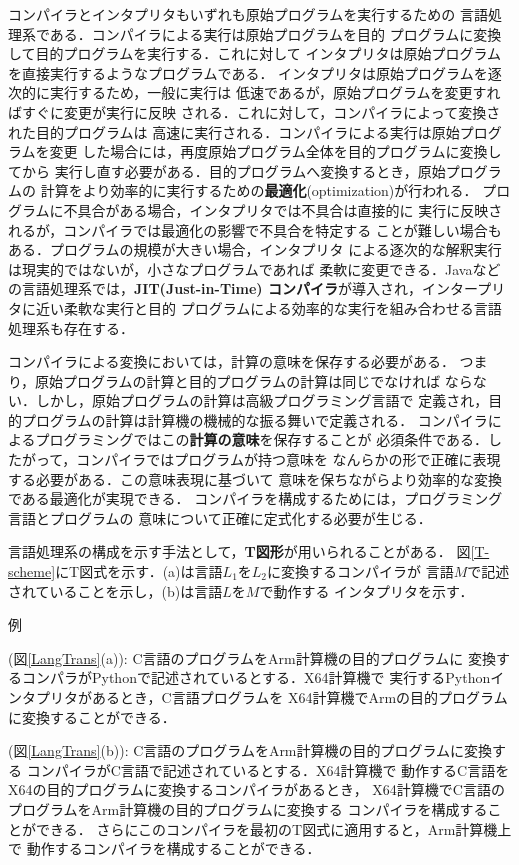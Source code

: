 \documentclass[dvipdfmx,a4j]{jbook}
\newcounter{coffee}
\begin{document}
コンパイラとインタプリタもいずれも原始プログラムを実行するための
言語処理系である．コンパイラによる実行は原始プログラムを目的
プログラムに変換して目的プログラムを実行する．これに対して
インタプリタは原始プログラムを直接実行するようなプログラムである．
インタプリタは原始プログラムを逐次的に実行するため，一般に実行は
低速であるが，原始プログラムを変更すればすぐに変更が実行に反映
される．これに対して，コンパイラによって変換された目的プログラムは
高速に実行される．コンパイラによる実行は原始プログラムを変更
した場合には，再度原始プログラム全体を目的プログラムに変換してから
実行し直す必要がある．目的プログラムへ変換するとき，原始プログラムの
計算をより効率的に実行するための{\bf 最適化}(optimization)が行われる．
プログラムに不具合がある場合，インタプリタでは不具合は直接的に
実行に反映されるが，コンパイラでは最適化の影響で不具合を特定する
ことが難しい場合もある．プログラムの規模が大きい場合，インタプリタ
による逐次的な解釈実行は現実的ではないが，小さなプログラムであれば
柔軟に変更できる．Javaなどの言語処理系では，{\bf JIT(Just-in-Time)
コンパイラ}が導入され，インタープリタに近い柔軟な実行と目的
プログラムによる効率的な実行を組み合わせる言語処理系も存在する．

コンパイラによる変換においては，計算の意味を保存する必要がある．
つまり，原始プログラムの計算と目的プログラムの計算は同じでなければ
ならない．しかし，原始プログラムの計算は高級プログラミング言語で
定義され，目的プログラムの計算は計算機の機械的な振る舞いで定義される．
コンパイラによるプログラミングではこの{\bf 計算の意味}を保存することが
必須条件である．したがって，コンパイラではプログラムが持つ意味を
なんらかの形で正確に表現する必要がある．この意味表現に基づいて
意味を保ちながらより効率的な変換である最適化が実現できる．
コンパイラを構成するためには，プログラミング言語とプログラムの
意味について正確に定式化する必要が生じる．

言語処理系の構成を示す手法として，{\bf T図形}が用いられることがある．
図\ref{T-scheme}にT図式を示す．(a)は言語$L_1$を$L_2$に変換するコンパイラが
言語$M$で記述されていることを示し，(b)は言語$L$を$M$で動作する
インタプリタを示す．

\begin{list}{例}{}
  \item (図\ref{LangTrans}(a)):
C言語のプログラムをArm計算機の目的プログラムに
変換するコンパラがPythonで記述されているとする．X64計算機で
実行するPythonインタプリタがあるとき，C言語プログラムを
X64計算機でArmの目的プログラムに変換することができる．
  \item (図\ref{LangTrans}(b)):
C言語のプログラムをArm計算機の目的プログラムに変換する
コンパイラがC言語で記述されているとする．X64計算機で
動作するC言語をX64の目的プログラムに変換するコンパイラがあるとき，
X64計算機でC言語のプログラムをArm計算機の目的プログラムに変換する
コンパイラを構成することができる．
さらにこのコンパイラを最初のT図式に適用すると，Arm計算機上で
動作するコンパイラを構成することができる．
\end{list}
\end{document}
